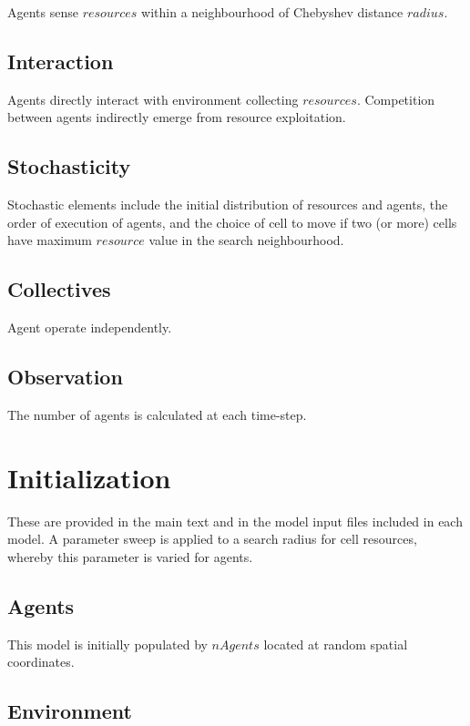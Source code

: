 \documentclass[11pt,a4paper,twocolumn,notitlepage]{article}
\begin{document}
Agents sense  $resources$ within a neighbourhood of Chebyshev distance $radius$. %

\subsection{Interaction}

Agents directly interact with environment collecting $resources$. Competition between agents indirectly emerge from resource exploitation. 

\subsection{Stochasticity}

Stochastic elements include the initial  distribution of resources and agents,  the order of execution of agents, and the choice of cell to move if two (or more) cells have maximum $resource$ value in the search neighbourhood. 

\subsection{Collectives}

Agent operate independently. 

\subsection{Observation}

The number of agents is calculated at each time-step.

\section{Initialization}

These are provided in the main text and in the model input files included in each model. A parameter sweep is applied to a search radius for cell resources, whereby this parameter is varied for agents.

\subsection{Agents}

This model is initially populated by $nAgents$ located at random spatial coordinates.

\subsection{Environment}
\end{document}

